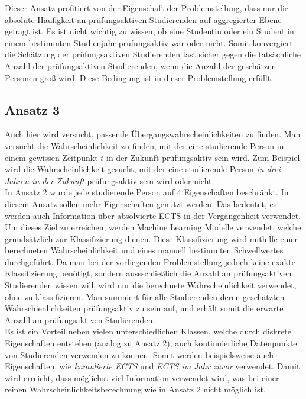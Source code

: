 Dieser Ansatz profitiert von der Eigenschaft der Problemstellung, dass nur die absolute H\"aufigkeit an pr\"ufungsaktiven Studierenden auf aggregierter Ebene
gefragt ist. Es ist nicht wichtig zu wissen, ob eine Studentin oder ein Student in einem bestimmten Studienjahr pr\"ufungsaktiv war oder nicht.
Somit konvergiert die Sch\"atzung der pr\"ufungsaktiven Studierenden
fast sicher gegen die tats\"achliche Anzahl der pr\"ufungsaktiven Studierenden, wenn die Anzahl der gesch\"atzen Personen gro{\ss} wird. Diese Bedingung ist in dieser Problemstellung
erf\"ullt. \\







\subsection{Ansatz 3}
\label{sec:appr3}

Auch hier wird versucht, passende \"Ubergangswahrscheinlichkeiten zu finden. Man versucht die Wahrscheinlichkeit zu finden, mit der eine studierende Person in einem
gewissen Zeitpunkt $t$ in der Zukunft pr\"ufungsaktiv sein wird.
Zum Beispiel wird die Wahrscheinlichkeit gesucht, mit der eine studierende Person \textit{in drei Jahren in der Zukunft} pr\"ufungsaktiv sein wird oder nicht. \\


In Ansatz 2 wurde jede studierende Person auf 4 Eigenschaften beschr\"ankt.
In diesem Ansatz sollen mehr Eigenschaften genutzt werden. Das bedeutet, es werden auch Information
\"uber absolvierte ECTS in der Vergangenheit verwendet. \\


Um dieses Ziel zu erreichen, werden Machine Learning Modelle verwendet, welche grunds\"atzlich zur Klassifizierung dienen.
Diese Klassifizierung wird mithilfe einer berechneten Wahrscheinlichkeit und eines manuell bestimmten Schwellwertes durchgef\"uhrt.
Da man bei der vorliegenden Problemstellung jedoch keine exakte Klassifizierung ben\"otigt, sondern aussschlie{\ss}lich die Anzahl an
pr\"ufungsaktiven Studierenden wissen will, wird nur die berechnete Wahrscheinlichkeit verwendet, ohne zu klassifizieren. Man summiert f\"ur alle 
Studierenden deren gesch\"atzten Wahrschienlichkeiten pr\"ufungsaktiv zu sein auf, und erh\"alt somit die erwarte Anzahl an pr\"ufungsaktiven Studierenden. \\

Es ist ein Vorteil neben vielen unterschiedlichen Klassen, welche durch diskrete Eigenschaften entstehen (analog zu Ansatz 2), auch kontinuierliche Datenpunkte von
Studierenden verwenden zu k\"onnen. Somit werden beispielsweise auch Eigenschaften, wie \textit{\glqq kumulierte ECTS\grqq{}} und \textit{\glqq ECTS im Jahr zuvor\grqq{}} verwendet. Damit wird erreicht, dass
m\"oglichst viel Information verwendet wird, was bei einer reinen Wahrscheinlichkeitsberechnung wie in Ansatz 2 nicht m\"oglich ist. \\

